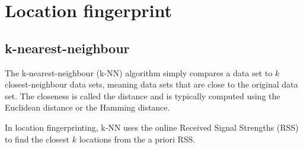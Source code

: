
\section{Location fingerprint}

  \subsection{k-nearest-neighbour}

  The k-nearest-neighbour (k-NN) algorithm simply compares a data set to $k$ closest-neighbour data sets, meaning data sets that are close to the original data set. The closeness is called the distance and is typically computed using the Euclidean distance or the Hamming distance.\cite{Liu2007, wiki_knn}

  In location fingerprinting, k-NN uses the online Received Signal Strengths (RSS) to find the closest $k$ locations from the a priori RSS.
